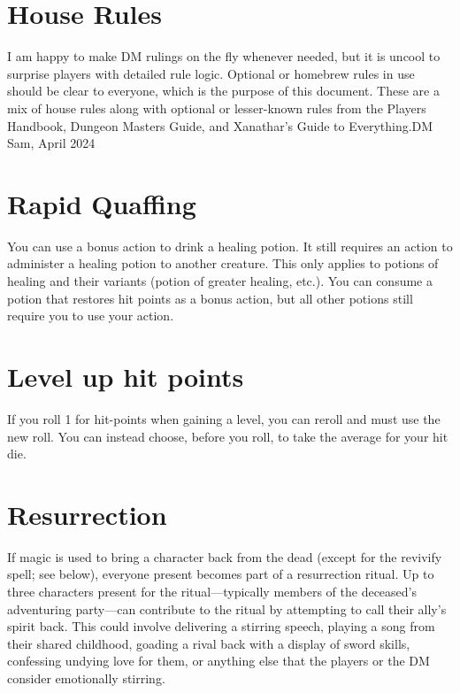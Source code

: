 \documentclass[a4paper,10pt,twoside,twocolumn,openany,bg=none,nodeprecatedcode]{dndarticle}
\begin{document}
\pagestyle{empty}

\section*{House Rules}

{I am happy to make DM rulings on the fly whenever needed, but it is uncool to surprise players with detailed rule logic. Optional or homebrew rules in use should be clear to everyone, which is the purpose of this document. These are a mix of house rules along with optional or lesser-known rules from the Players Handbook, Dungeon Masters Guide, and Xanathar's Guide to Everything.}{DM Sam, April 2024}

\section{Rapid Quaffing}

You can use a bonus action to drink a healing potion. It still requires an action to administer a healing potion to another creature. This only applies to potions of healing and their variants (potion of greater healing, etc.). You can consume a potion that restores hit points as a bonus action, but all other potions still require you to use your action.

\section{Level up hit points}

If you roll 1 for hit-points when gaining a level, you can reroll and must use the new roll. You can instead choose, before you roll, to take the average for your hit die.

\section{Resurrection}

If magic is used to bring a character back from the dead (except for the revivify spell; see below), everyone present becomes part of a resurrection ritual. Up to three characters present for the ritual---typically members of the deceased's adventuring party---can contribute to the ritual by attempting to call their ally's spirit back. This could involve delivering a stirring speech, playing a song from their shared childhood, goading a rival back with a display of sword skills, confessing undying love for them, or anything else that the players or the DM consider emotionally stirring.
\end{document}
